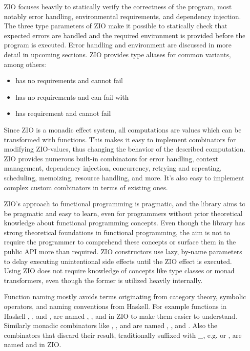 ZIO focuses heavily to statically verify the correctness of the program, most notably error handling, environmental requirements, and dependency injection. The three type parameters of ZIO make it possible to statically check that expected errors are handled and the required environment is provided before the program is executed. Error handling and environment are discussed in more detail in upcoming sections. ZIO provides type aliases for common variants, among others:
\begin{itemize}
    \item {} has no requirements and cannot fail
    \item {} has no requirements and can fail with 
    \item {} has requirement  and cannot fail
\end{itemize}

Since ZIO is a monadic effect system, all computations are values which can be transformed with functions. This makes it easy to implement combinators for modifying ZIO-values, thus changing the behavior of the described computation. ZIO provides numerous built-in combinators for error handling, context management, dependency injection, concurrency, retrying and repeating, scheduling, memoizing, resource handling, and more. It's also easy to implement complex custom combinators in terms of existing ones.

ZIO's approach to functional programming is pragmatic, and the library aims to be pragmatic and easy to learn, even for programmers without prior theoretical knowledge about functional programming concepts. Even though the library has strong theoretical foundations in functional programming, the aim is not to require the programmer to comprehend these concepts or surface them in the public API more than required. ZIO constructors use lazy, by-name parameters to delay executing unintentional side effects until the ZIO effect is executed. Using ZIO does not require knowledge of concepts like type classes or monad transformers, even though the former is utilized heavily internally.

Function naming mostly avoids terms originating from category theory, symbolic operators, and naming conventions from Haskell. For example functions in Haskell , , and , are named , , and  in ZIO to make them easier to understand. Similarly monadic combinators like , , and  are named , , and . Also the combinators that discard their result, traditionally suffixed with \_, e.g.  or , are named  and  in ZIO.


